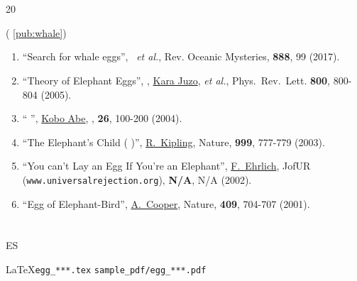 \documentclass{article}
\begin{document}
\section{ }

	 20 
	 
	 ( \ref{pub:whale}) 
	 
	 

	 
	 
	 
	\begin{enumerate}
		\item \label{pub:whale} ``Search for whale eggs'', 
				\me\ {\it et al.},
				Rev. Oceanic Mysteries, {\bf 888}, 99 (2017).
				
		\item \label{pub:theoegg} ``Theory of Elephant Eggs'', 
				\me, \underline{Kara Juzo}, {\it et al.},
				Phys.\ Rev.\ Lett. {\bf 800}, 800-804 (2005). 
				
		\item `` '', 
				\underline{Kobo Abe}, 
				 , {\bf 26}, 100-200 (2004).
		\item ``The Elephant's Child ( )'', 
				\underline{R.~Kipling},
				Nature, {\bf 999}, 777-779 (2003).
		\item ``You can't Lay an Egg If You're an Elephant'', 
				\underline{F.~Ehrlich},
				JofUR\\
				 ({\tt www.universalrejection.org}), {\bf N/A}, N/A (2002).
		\item ``Egg of Elephant-Bird'', 
				\underline{A.~Cooper},
				Nature, {\bf 409}, 704-707 (2001).	
	\end{enumerate}




\section{ }

	 ES 

	\LaTeX  \texttt{egg\_***.tex}  \texttt{sample\_pdf/egg\_***.pdf} 



\end{document}
